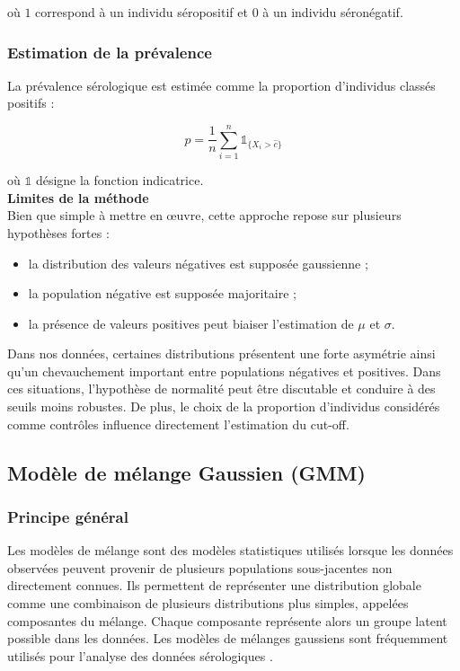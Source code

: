 \documentclass[a4paper]{article}
\begin{document}
où $1$ correspond à un individu séropositif et $0$ à un individu séronégatif. \\

\newpage 

\subsubsection{Estimation de la prévalence}

La prévalence sérologique est estimée comme la proportion d'individus classés positifs :

\[
p = \frac{1}{n} \sum_{i=1}^{n} \mathbb{1}_{\{X_i > \hat{c}\}}
\]

où $\mathbb{1}$ désigne la fonction indicatrice. \\


\textbf{Limites de la méthode} \\

Bien que simple à mettre en œuvre, cette approche repose sur plusieurs hypothèses fortes :

\begin{itemize}
    \item la distribution des valeurs négatives est supposée gaussienne ;
    \item la population négative est supposée majoritaire ;
    \item la présence de valeurs positives peut biaiser l’estimation de $\mu$ et $\sigma$.
\end{itemize}

Dans nos données, certaines distributions présentent une forte asymétrie ainsi qu’un chevauchement important entre populations négatives et positives. Dans ces situations, l’hypothèse de normalité peut être discutable et conduire à des seuils moins robustes. De plus, le choix de la proportion d’individus considérés comme contrôles influence directement l’estimation du cut-off.



\subsection{Modèle de mélange Gaussien (GMM)}

\subsubsection{Principe général}

Les modèles de mélange sont des modèles statistiques utilisés lorsque les données observées peuvent provenir de plusieurs populations sous-jacentes non directement connues. Ils permettent de représenter une distribution globale comme une combinaison de plusieurs distributions plus simples, appelées composantes du mélange. Chaque composante représente alors un groupe latent possible dans les données.
Les modèles de mélanges gaussiens sont fréquemment utilisés
pour l’analyse des données sérologiques \cite{garnier2017}.
\end{document}
